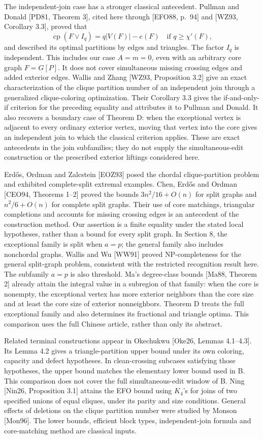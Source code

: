 \documentclass[english,11pt,a4paper]{article}
\newcounter{none}
\begin{document}
The independent-join case has a stronger classical antecedent. Pullman
and Donald {[}PD81, Theorem 3{]}, cited here through {[}EFO88, p.~94{]}
and {[}WZ93, Corollary 3.3{]}, proved that \[
\operatorname{cp}(F\vee I_q)=q|V(F)|-e(F)
\quad\text{if }q\ge\chi'(F),
\] and described its optimal partitions by edges and triangles. The
factor \(I_q\) is independent. This includes our case \(A=m=0\), even
with an arbitrary core graph \(F=G[P]\). It does not cover simultaneous
missing crossing edges and added exterior edges. Wallis and Zhang
{[}WZ93, Proposition 3.2{]} give an exact characterization of the clique
partition number of an independent join through a generalized
clique-coloring optimization. Their Corollary 3.3 gives the
if-and-only-if criterion for the preceding equality and attributes it to
Pullman and Donald. It also recovers a boundary case of Theorem D: when
the exceptional vertex is adjacent to every ordinary exterior vertex,
moving that vertex into the core gives an independent join to which the
classical criterion applies. These are exact antecedents in the join
subfamilies; they do not supply the simultaneous-edit construction or
the prescribed exterior liftings considered here.

Erdős, Ordman and Zalcstein {[}EOZ93{]} posed the chordal
clique-partition problem and exhibited complete-split extremal examples.
Chen, Erdős and Ordman {[}CEO94, Theorems 1--2{]} proved the bounds
\(3n^2/16+O(n)\) for split graphs and \(n^2/6+O(n)\) for complete split
graphs. Their use of core matchings, triangular completions and accounts
for missing crossing edges is an antecedent of the construction method.
Our assertion is a finite equality under the stated local hypotheses,
rather than a bound for every split graph. In Section 8, the exceptional
family is split when \(a=p\); the general family also includes
nonchordal graphs. Wallis and Wu {[}WW91{]} proved NP-completeness for
the general split-graph problem, consistent with the restricted
recognition result here. The subfamily \(a=p\) is also threshold. Ma's
degree-class bounds {[}Ma88, Theorem 2{]} already attain the integral
value in a subregion of that family: when the core is nonempty, the
exceptional vertex has more exterior neighbors than the core size and at
least the core size of exterior nonneighbors. Theorem D treats the full
exceptional family and also determines its fractional and triangle
optima. This comparison uses the full Chinese article, rather than only
its abstract.

Related terminal constructions appear in Okechukwu {[}Oke26, Lemmas
4.1--4.3{]}. Its Lemma 4.2 gives a triangle-partition upper bound under
its own coloring, capacity and defect hypotheses. In clean-crossing
subcases satisfying those hypotheses, the upper bound matches the
elementary lower bound used in B. This comparison does not cover the
full simultaneous-edit window of B. Ning {[}Nin26, Proposition 3.1{]}
attains the EFO bound using \(K_4\)'s for joins of two specified unions
of equal cliques, under its parity and size conditions. General effects
of deletions on the clique partition number were studied by Monson
{[}Mon96{]}. The lower bounds, efficient block types, independent-join
formula and core-matching method are classical inputs.
\end{document}

